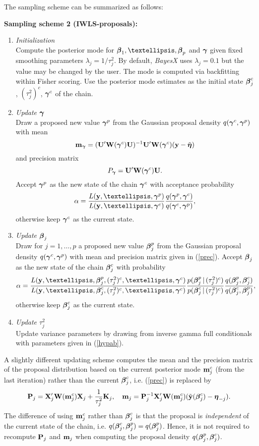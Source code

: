 \documentclass[11pt,a4paper,twoside]{bayesxarticle}
\begin{document}
The sampling scheme can be summarized as follows:

{\bf Sampling scheme 2 (IWLS-proposals):}
\begin{enumerate}
\item {\em Initialization} \\
Compute the posterior mode for $\betavec_1,\dots,\betavec_p$ and $\boldsymbol{\gamma}$
given fixed smoothing parameters $\lambda_j = 1/\tau^2_j$. By
default, {\em BayesX} uses $\lambda_j = 0.1$ but the value may be
changed by the user. The mode is computed via backfitting within
Fisher scoring. Use the posterior mode estimates as the initial
state $\boldsymbol{\beta}_j^c$, $(\tau_j^2)^c$, $\boldsymbol{\gamma}^c$ of the chain.
\item {\em Update $\boldsymbol{\gamma}$} \\
Draw a proposed new value $\boldsymbol{\gamma}^p$ from the Gaussian proposal
density $q(\boldsymbol{\gamma}^c,\boldsymbol{\gamma}^p)$ with mean
$$
\mathbf{m}_{\boldsymbol{\gamma}} = (\mathbf{U}' \mathbf{W}(\boldsymbol{\gamma}^c) \mathbf{U})^{-1}\mathbf{U}' \mathbf{W}(\boldsymbol{\gamma}^c) (\mathbf{y}-\tilde{\boldsymbol{\eta}}
)
$$
and precision matrix
$$
P_{\boldsymbol{\gamma}} = \mathbf{U}' \mathbf{W}(\boldsymbol{\gamma}^c) \mathbf{U}.
$$
Accept $\boldsymbol{\gamma}^p$ as the new state of the chain $\boldsymbol{\gamma}^c$ with
acceptance probability
$$
\alpha = \frac{ L(\yvec,\dots,\gammavec^p)} {L(\yvec,\dots,\gammavec^c)} \frac{
q(\gammavec^p,\gammavec^c)}{q(\gammavec^c,\gammavec^p)},
$$
otherwise keep $\boldsymbol{\gamma}^c$ as the current state.
\item {\em Update $\boldsymbol{\beta}_j$} \\
Draw for $j=1,\dots,p$ a proposed new value $\boldsymbol{\beta}_j^p$ from the
Gaussian proposal density $q(\boldsymbol{\gamma}^c,\boldsymbol{\gamma}^p)$ with mean and
precision matrix given in (\ref{prec}). Accept $\boldsymbol{\beta}_j$ as the
new state of the chain $\boldsymbol{\beta}_j^c$ with probability
$$
\alpha = \frac{
L(\yvec,\dots,\betavec^{p}_j,(\tau_j^2)^{c},\dots,\gammavec^c)}
{L(\yvec,\dots,\betavec^{c}_j,(\tau_j^2)^{c},\dots,\gammavec^c)}
\frac{p(\betavec_j^p \, | \, (\tau_j^2)^c)}{p(\betavec_j^c \, | \,
(\tau_j^2)^c)} \frac{
q(\betavec_j^p,\betavec_j^c)}{q(\betavec_j^c,\betavec_j^p)},
$$
otherwise keep $\boldsymbol{\beta}_j^c$ as the current state.
\item {\em Update $\tau^2_j$} \\
Update variance parameters by drawing from inverse gamma full
conditionals with parameters given in (\ref{hypab}).
\end{enumerate}

A slightly different updating scheme computes the mean and the
precision matrix of the proposal distribution based on the current
posterior mode $\mathbf{m}_j^c$ (from the last iteration) rather than the
current $\boldsymbol{\beta}_j^c$, i.e. (\ref{prec}) is replaced by
\begin{equation}
\label{precmode} \Pvec_j = \Xvec_j'\Wvec(\mvec_j^c)\Xvec_j + \frac{1}{\tau^2_j}\Kvec_j,
\quad \mvec_j = \Pvec_j^{-1}\Xvec_j'\Wvec(\mvec_j^c)(\tilde{\yvec}(\betavec^c_j) - \etavec_{-j}).
\end{equation}
The difference of using $\mathbf{m}_j^c$ rather than $\boldsymbol{\beta}_j^c$ is that
the proposal is {\em independent} of the current state of the
chain, i.e. $q(\boldsymbol{\beta}_j^c,\boldsymbol{\beta}_j^p) = q(\boldsymbol{\beta}_j^p)$. Hence, it is
not required to recompute $\mathbf{P}_j$ and $\mathbf{m}_j$ when computing the
proposal density $q(\boldsymbol{\beta}_j^p,\boldsymbol{\beta}_j^c)$.
\end{document}
